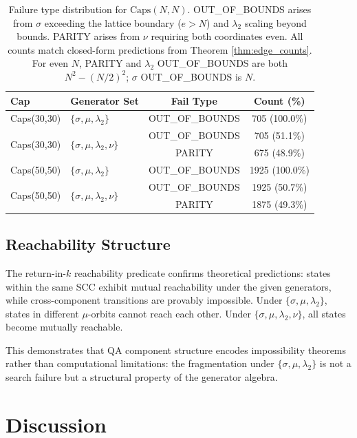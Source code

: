 \documentclass[11pt]{article}
\theoremstyle{definition}
\begin{document}
\begin{table}[h]
\centering
\caption{Failure type distribution for $\mathrm{Caps}(N,N)$. OUT\_OF\_BOUNDS arises from $\sigma$ exceeding the lattice boundary ($e > N$) and $\lambda_2$ scaling beyond bounds. PARITY arises from $\nu$ requiring both coordinates even. All counts match closed-form predictions from Theorem \ref{thm:edge_counts}. For even $N$, PARITY and $\lambda_2$ OUT\_OF\_BOUNDS are both $N^2-(N/2)^2$; $\sigma$ OUT\_OF\_BOUNDS is $N$.}
\label{tab:failures}
\begin{tabular}{llcc}
\toprule
Cap & Generator Set & Fail Type & Count (\%) \\
\midrule
\multirow{1}{*}{Caps(30,30)} & $\{\sigma,\mu,\lambda_2\}$ & OUT\_OF\_BOUNDS & 705 (100.0\%) \\
\cmidrule(lr){2-4}
\multirow{2}{*}{Caps(30,30)} & \multirow{2}{*}{$\{\sigma,\mu,\lambda_2,\nu\}$} & OUT\_OF\_BOUNDS & 705 (51.1\%) \\
 & & PARITY & 675 (48.9\%) \\
\midrule
\multirow{1}{*}{Caps(50,50)} & $\{\sigma,\mu,\lambda_2\}$ & OUT\_OF\_BOUNDS & 1925 (100.0\%) \\
\cmidrule(lr){2-4}
\multirow{2}{*}{Caps(50,50)} & \multirow{2}{*}{$\{\sigma,\mu,\lambda_2,\nu\}$} & OUT\_OF\_BOUNDS & 1925 (50.7\%) \\
 & & PARITY & 1875 (49.3\%) \\
\bottomrule
\end{tabular}
\end{table}

\subsection{Reachability Structure}

The return-in-$k$ reachability predicate confirms theoretical predictions: states within the same SCC exhibit mutual reachability under the given generators, while cross-component transitions are provably impossible. Under $\{\sigma,\mu,\lambda_2\}$, states in different $\mu$-orbits cannot reach each other. Under $\{\sigma,\mu,\lambda_2,\nu\}$, all states become mutually reachable.

This demonstrates that QA component structure encodes impossibility theorems rather than computational limitations: the fragmentation under $\{\sigma,\mu,\lambda_2\}$ is not a search failure but a structural property of the generator algebra.

\section{Discussion}
\label{sec:discussion}
\end{document}
